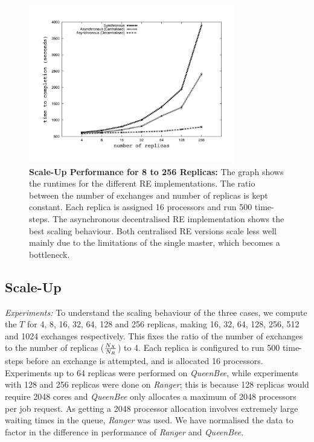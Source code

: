 \documentclass{rspublic}
\newcommand{\alnote}[1]{ {\textcolor{blue} { ***andre: #1 }}}
\newcommand{\athotanote}[1]{ {\textcolor{green} { ***athota: #1 }}}
\newcommand{\alnote}[1]{}
\newcommand{\athotanote}[1]{}
\begin{document}
%
\begin{figure}
\centering
\includegraphics[width=0.8\textwidth]{../data/scale_up.pdf}
\caption{\small \textbf{Scale-Up Performance for 8 to 256 Replicas:}
  The graph shows the runtimes for the different RE implementations.
  The ratio between the number of exchanges and number of replicas is
  kept constant. Each replica is assigned 16 processors and run 500
  time-steps.  The asynchronous decentralised RE implementation shows
  the best scaling behaviour. Both centralised RE versions scale less
  well mainly due to the limitations of the single master, which
  becomes a
  bottleneck.}%
\label{fig:scaleup}
\vspace{-1em}
\end{figure}


\subsection{Scale-Up}


{\it Experiments: } To understand the scaling behaviour of the three
cases, we compute the $T$ for 4, 8, 16, 32, 64, 128 and 256 replicas,
making 16, 32, 64, 128, 256, 512 and 1024 exchanges respectively. This
fixes the ratio of the number of exchanges to the number of replicas
($N_X \over N_R$) to 4.  Each replica is configured to run 500
time-steps before an exchange is attempted, and is allocated 16
processors. Experiments up to 64 replicas were performed on {\it
  QueenBee}, while experiments with 128 and 256 replicas were done on
\emph{Ranger}; this is because 128 replicas would require 2048 cores and \emph{QueenBee} only allocates a
maximum of 2048 processors per job request. As getting a 2048
processor allocation involves extremely large waiting times in the
queue, \emph{Ranger} was used. We have normalised the data to factor in the difference in
performance of {\it Ranger} and {\it QueenBee}.
\end{document}
